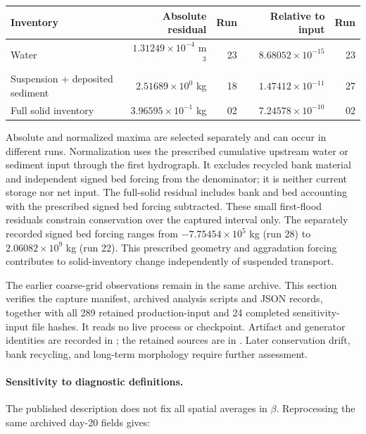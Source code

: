 \begin{center}\small
\begin{tabular}{lrrrr}
\toprule
Inventory & Absolute residual & Run & Relative to input & Run \\
\midrule
Water & $1.31249\times10^{-4}$ m$^3$ & 23 & $8.68052\times10^{-15}$ & 23 \\
Suspension + deposited sediment & $2.51689\times10^{0}$ kg & 18 & $1.47412\times10^{-11}$ & 27 \\
Full solid inventory & $3.96595\times10^{-1}$ kg & 02 & $7.24578\times10^{-10}$ & 02 \\
\bottomrule\end{tabular}\end{center}
Absolute and normalized maxima are selected separately and can occur
in different runs. Normalization uses the prescribed cumulative
upstream water or sediment input through the first hydrograph.
It excludes recycled bank material and independent signed bed forcing
from the denominator; it is neither current storage nor net input.
The full-solid residual includes bank and bed accounting with the
prescribed signed bed forcing subtracted. These small first-flood
residuals constrain conservation over the captured interval only.
The separately recorded signed bed forcing ranges from $-7.75454\times10^{5}$ kg
(run 28) to $2.06082\times10^{9}$ kg (run 22).
This prescribed geometry and aggradation forcing contributes to
solid-inventory change independently of suspended transport.

The earlier coarse-grid observations remain in the same archive.
This section verifies the capture manifest, archived analysis scripts
and JSON records, together with all 289 retained production-input
and 24 completed sensitivity-input file hashes.
It reads no live process or checkpoint. Artifact and generator
identities are recorded in ;
the retained sources are in .
Later conservation drift, bank recycling, and long-term morphology
require further assessment.

\paragraph{Sensitivity to diagnostic definitions.}
The published description does not fix all spatial averages in
$\beta$. Reprocessing the same archived day-20 fields gives:


